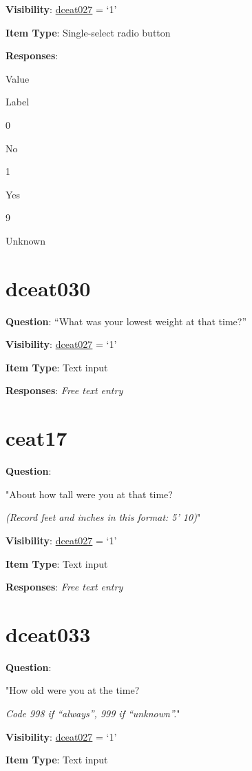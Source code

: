 \documentclass[]{book}
\begin{document}
\textbf{Visibility}: \protect\hyperlink{dceat027}{dceat027} = `1'

\textbf{Item Type}: Single-select radio button

\textbf{Responses}:

Value

Label

0

No

1

Yes

9

Unknown

\hypertarget{dceat030}{%
\section{dceat030}\label{dceat030}}

\textbf{Question}: ``What was your lowest weight at that time?''

\textbf{Visibility}: \protect\hyperlink{dceat027}{dceat027} = `1'

\textbf{Item Type}: Text input

\textbf{Responses}: \emph{Free text entry}

\hypertarget{ceat17}{%
\section{ceat17}\label{ceat17}}

\textbf{Question}:

"About how tall were you at that time?

\emph{(Record feet and inches in this format: 5' 10)}"

\textbf{Visibility}: \protect\hyperlink{dceat027}{dceat027} = `1'

\textbf{Item Type}: Text input

\textbf{Responses}: \emph{Free text entry}

\hypertarget{dceat033}{%
\section{dceat033}\label{dceat033}}

\textbf{Question}:

"How old were you at the time?

\emph{Code 998 if ``always'', 999 if ``unknown''.}"

\textbf{Visibility}: \protect\hyperlink{dceat027}{dceat027} = `1'

\textbf{Item Type}: Text input
\end{document}
